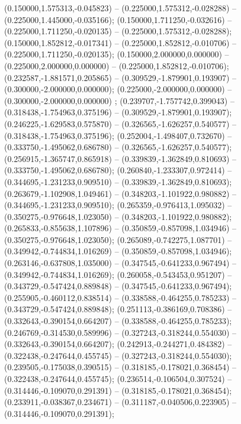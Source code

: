  (0.150000,1.575313,-0.045823) -- (0.225000,1.575312,-0.028288) -- (0.225000,1.445000,-0.035166);
 (0.150000,1.711250,-0.032616) -- (0.225000,1.711250,-0.020135) -- (0.225000,1.575312,-0.028288);
 (0.150000,1.852812,-0.017341) -- (0.225000,1.852812,-0.010706) -- (0.225000,1.711250,-0.020135);
 (0.150000,2.000000,0.000000) -- (0.225000,2.000000,0.000000) -- (0.225000,1.852812,-0.010706);
 (0.232587,-1.881571,0.205865) -- (0.309529,-1.879901,0.193907) -- (0.300000,-2.000000,0.000000);
 (0.225000,-2.000000,0.000000) -- (0.300000,-2.000000,0.000000) ;
 (0.239707,-1.757742,0.399043) -- (0.318438,-1.754963,0.375196) -- (0.309529,-1.879901,0.193907);
 (0.246225,-1.629583,0.575870) -- (0.326565,-1.626257,0.540577) -- (0.318438,-1.754963,0.375196);
 (0.252004,-1.498407,0.732670) -- (0.333750,-1.495062,0.686780) -- (0.326565,-1.626257,0.540577);
 (0.256915,-1.365747,0.865918) -- (0.339839,-1.362849,0.810693) -- (0.333750,-1.495062,0.686780);
 (0.260840,-1.233307,0.972414) -- (0.344695,-1.231233,0.909510) -- (0.339839,-1.362849,0.810693);
 (0.263679,-1.102908,1.049461) -- (0.348203,-1.101922,0.980882) -- (0.344695,-1.231233,0.909510);
 (0.265359,-0.976413,1.095032) -- (0.350275,-0.976648,1.023050) -- (0.348203,-1.101922,0.980882);
 (0.265833,-0.855638,1.107896) -- (0.350859,-0.857098,1.034946) -- (0.350275,-0.976648,1.023050);
 (0.265089,-0.742275,1.087701) -- (0.349942,-0.744834,1.016269) -- (0.350859,-0.857098,1.034946);
 (0.263146,-0.637808,1.035000) -- (0.347545,-0.641233,0.967494) -- (0.349942,-0.744834,1.016269);
 (0.260058,-0.543453,0.951207) -- (0.343729,-0.547424,0.889848) -- (0.347545,-0.641233,0.967494);
 (0.255905,-0.460112,0.838514) -- (0.338588,-0.464255,0.785233) -- (0.343729,-0.547424,0.889848);
 (0.251113,-0.386169,0.708386) -- (0.332643,-0.390154,0.664207) -- (0.338588,-0.464255,0.785233);
 (0.246769,-0.314530,0.589996) -- (0.327243,-0.318244,0.554030) -- (0.332643,-0.390154,0.664207);
 (0.242913,-0.244271,0.484382) -- (0.322438,-0.247644,0.455745) -- (0.327243,-0.318244,0.554030);
 (0.239505,-0.175038,0.390515) -- (0.318185,-0.178021,0.368454) -- (0.322438,-0.247644,0.455745);
 (0.236514,-0.106504,0.307524) -- (0.314446,-0.109070,0.291391) -- (0.318185,-0.178021,0.368454);
 (0.233911,-0.038367,0.234671) -- (0.311187,-0.040506,0.223905) -- (0.314446,-0.109070,0.291391);
